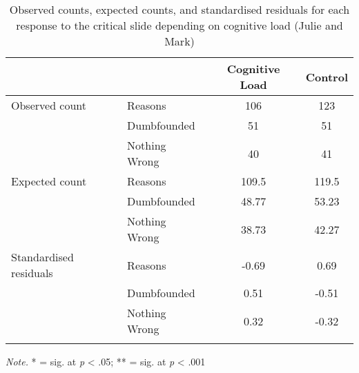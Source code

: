 \documentclass[
  american,
  man,floatsintext]{apa7}
\begin{document}
\begin{table}[tbp]

\begin{center}
\begin{threeparttable}

\caption{\label{tab:tabS6tab1dumbIncest}Observed counts, expected counts, and standardised residuals for each response to the critical slide depending on cognitive load (Julie and Mark)}

\begin{tabular}{llcc}
\toprule
 & \multicolumn{1}{c}{} & \multicolumn{1}{c}{Cognitive Load} & \multicolumn{1}{c}{Control}\\
\midrule
Observed count & Reasons & 106 & 123\\
 & Dumbfounded & 51 & 51\\
 & Nothing Wrong & 40 & 41\\
Expected count & Reasons & 109.5 & 119.5\\
 & Dumbfounded & 48.77 & 53.23\\
 & Nothing Wrong & 38.73 & 42.27\\
Standardised residuals & Reasons & -0.69 & 0.69\\
 & Dumbfounded & 0.51 & -0.51\\
 & Nothing Wrong & 0.32 & -0.32\\
\bottomrule
\addlinespace
\end{tabular}

\begin{tablenotes}[para]
\normalsize{\textit{Note.} * = sig. at \emph{p} < .05; ** = sig. at \emph{p} < .001}
\end{tablenotes}

\end{threeparttable}
\end{center}

\end{table}
\end{document}
